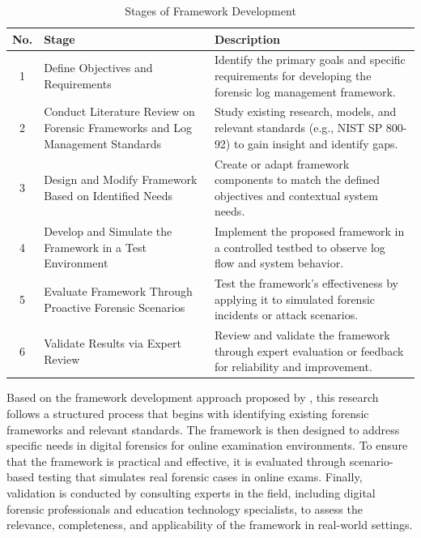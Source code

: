\begin{table}[H]
\centering
\caption{Stages of Framework Development}
\begin{tabular}{|c|p{4.5cm}|p{8.5cm}|}
\hline
\textbf{No.} & \textbf{Stage} & \textbf{Description} \\
\hline
1 & Define Objectives and Requirements & Identify the primary goals and specific requirements for developing the forensic log management framework. \\
\hline
2 & Conduct Literature Review on Forensic Frameworks and Log Management Standards & Study existing research, models, and relevant standards (e.g., NIST SP 800-92) to gain insight and identify gaps. \\
\hline
3 & Design and Modify Framework Based on Identified Needs & Create or adapt framework components to match the defined objectives and contextual system needs. \\
\hline
4 & Develop and Simulate the Framework in a Test Environment & Implement the proposed framework in a controlled testbed to observe log flow and system behavior. \\
\hline
5 & Evaluate Framework Through Proactive Forensic Scenarios & Test the framework’s effectiveness by applying it to simulated forensic incidents or attack scenarios. \\
\hline
6 & Validate Results via Expert Review & Review and validate the framework through expert evaluation or feedback for reliability and improvement. \\
\hline
\end{tabular}
\end{table}

Based on the framework development approach proposed by \citet{adel2024ethicore}, this research follows a structured process that begins with identifying existing forensic frameworks and relevant standards. The framework is then designed to address specific needs in digital forensics for online examination environments. To ensure that the framework is practical and effective, it is evaluated through scenario-based testing that simulates real forensic cases in online exams. Finally, validation is conducted by consulting experts in the field, including digital forensic professionals and education technology specialists, to assess the relevance, completeness, and applicability of the framework in real-world settings.

